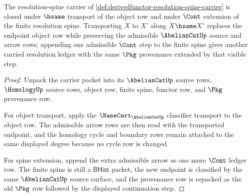 \begin{theorem}\label{thm:derivedfunctor-resolution-carrier-obligation}
The resolution-spine carrier of \autoref{def:derivedfunctor-resolution-spine-carrier} is closed under $\hsame$ transport of the object row and under $\Cont$ extension of the finite resolution spine. Transporting $X$ to $X'$ along $X\hsame X'$ replaces the endpoint object row while preserving the admissible $\AbelianCatUp$ source and arrow rows; appending one admissible $\Cont$ step to the finite spine gives another carried resolution ledger with the same $\Pkg$ provenance extended by that visible step.
\end{theorem}
\begin{proof}
Unpack the carrier packet into its $\AbelianCatUp$ source rows, $\HomologyUp$ source rows, object row, finite spine, functor row, and $\Pkg$ provenance row.

For object transport, apply the $\NameCert_{\AbelianCatUp}$ classifier transport to the object row. The admissible arrow rows are then read with the transported endpoint, and the homology cycle and boundary rows remain attached to the same displayed degree because no cycle row is changed.

For spine extension, append the extra admissible arrow as one more $\Cont$ ledger row. The finite spine is still a $\mathsf{BHist}$ packet, the new endpoint is classified by the same $\AbelianCatUp$ source surface, and the provenance row is repacked as the old $\Pkg$ row followed by the displayed continuation step.
\end{proof}

